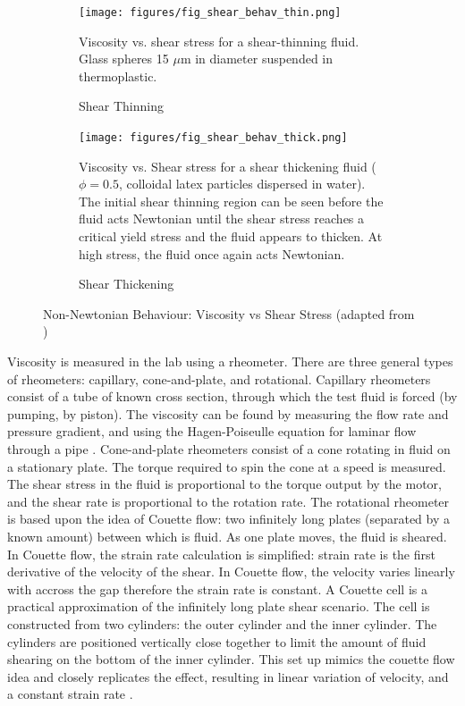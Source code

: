\documentclass[twoside,a4]{report}
\def\br{\newline \newline \noindent}
\begin{document}
	\begin{figure}[!htb]
		\centering
		\begin{subfigure}[t]{0.45\textwidth}
			\centering
			\texttt{[image: figures/fig\_shear\_behav\_thin.png]}
			\caption{Shear Thinning}
			\label{figshearthin}
			\footnotesize 
			Viscosity vs. shear stress for a shear-thinning fluid. Glass spheres 15 $\mu$m in diameter suspended in thermoplastic.
		\end{subfigure}
		\begin{subfigure}[t]{0.45\textwidth}
			\centering
			\texttt{[image: figures/fig\_shear\_behav\_thick.png]}
			\caption{Shear Thickening}
			\label{figshearthick}
			\footnotesize 
			Viscosity vs. Shear stress for a shear thickening fluid ($\phi=0.5$, colloidal latex particles dispersed in water). The initial shear thinning region can be seen before the fluid acts Newtonian until the shear stress reaches a critical yield stress and the fluid appears to thicken. At high stress, the fluid once again acts Newtonian.
		\end{subfigure}
		\label{figshearthinthick}
		\caption{Non-Newtonian Behaviour: Viscosity vs Shear Stress (adapted from \cite{figshearthin, figshearthick})}
	\end{figure}
	
	\noindent
	Viscosity is measured in the lab using a rheometer. There are three general types of rheometers: capillary, cone-and-plate, and rotational. Capillary rheometers consist of a tube of known cross section, through which the test fluid is forced (by pumping, by piston). The viscosity can be found by measuring the flow rate and pressure gradient, and using the Hagen-Poiseulle equation for laminar flow through a pipe \cite{backcaprheom}. Cone-and-plate rheometers consist of a cone rotating in fluid on a stationary plate. The torque required to spin the cone at a speed is measured. The shear stress in the fluid is proportional to the torque output by the motor, and the shear rate is proportional to the rotation rate. %
	\br
	The rotational rheometer is based upon the idea of Couette flow: two infinitely long plates (separated by a known amount) between which is fluid. As one plate moves, the fluid is sheared. In Couette flow, the strain rate calculation is simplified: strain rate is the first derivative of the velocity of the shear. In Couette flow, the velocity varies linearly with accross the gap therefore the strain rate is constant. A Couette cell is a practical approximation of the infinitely long plate shear scenario. The cell is constructed from two cylinders: the outer cylinder and the inner cylinder. The cylinders are positioned vertically close together to limit the amount of fluid shearing on the bottom of the inner cylinder. This set up mimics the couette flow idea and closely replicates the effect, resulting in linear variation of velocity, and a constant strain rate \cite{couetteshearcell}.
	
\end{document}
